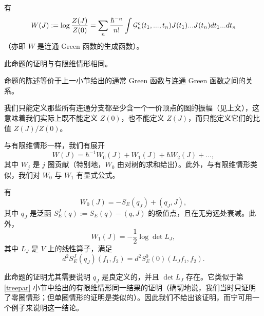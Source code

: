 \begin{proposition} 有
$$
W(J):=\log \frac{Z(J)}{Z(0)}=
\sum_n \frac{\hbar^{-n}}{n!}\int\mathcal{G}_n^c(t_1,...,t_n)J(t_1)...J(t_n)dt_1...dt_n
$$
（亦即 $W$ 是连通 Green 函数的生成函数）。
\end{proposition}


此命题的证明与有限维情形相同。

\begin{remark} 命题的陈述等价于上一小节给出的通常 Green 函数与连通 Green 函数之间的关系。
\end{remark} 

\begin{remark} 我们只能定义那些所有连通分支都至少含一个一价顶点的图的振幅（见上文），这意味着我们实际上既不能定义 $Z(0)$，也不能定义 $Z(J)$，而只能定义它们的比值 $Z(J)/Z(0)$。
\end{remark} 

与有限维情形一样，我们有展开
$$
W(J)=\hbar^{-1}W_0(J)+W_1(J)+\hbar W_2(J)+...,
$$
其中 $W_j$ 是 $j$ 圈贡献（特别地，$W_0$ 由对树的求和给出）。此外，与有限维情形类似，我们对 $W_0$ 与 $W_1$ 有显式公式。

\begin{proposition} 有
$$
W_0(J)=-S_E(q_J)+(q_J,J), 
$$
其中 $q_J$ 是泛函 $S_E^J(q):=S_E(q)-(q,J)$ 的极值点，且在无穷远处衰减。此外，
$$
W_1(J)=-\frac{1}{2}\log \det L_J,
$$ 其中 $L_J$ 是 $V$ 上的线性算子，满足
$$
d^2S_E^J(q_J)(f_1,f_2)=d^2S_E^0(0)(L_Jf_1,f_2).
$$
\end{proposition}

此命题的证明尤其需要说明 $q_J$ 是良定义的，并且 $\det L_J$ 存在。它类似于第 \ref{treepar} 小节中给出的有限维情形同一结果的证明（确切地说，我们当时只证明了零圈情形；但单圈情形的证明是类似的）。因此我们不给出该证明，而宁可用一个例子来说明这一结论。

